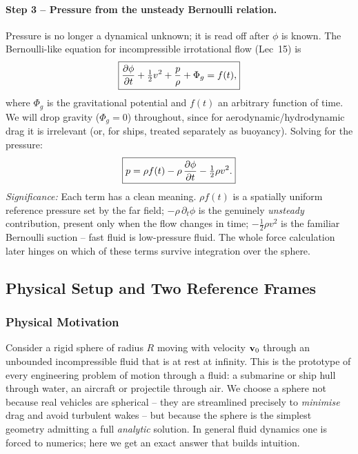 \documentclass[../main.tex]{subfiles}
\begin{document}
\paragraph{Step 3 -- Pressure from the unsteady Bernoulli relation.}
Pressure is no longer a dynamical unknown; it is read off after $\phi$ is known. The Bernoulli-like equation for incompressible irrotational flow (Lec~15) is
\begin{equation}
  \boxed{\pdv{\phi}{t} + \tfrac{1}{2}v^2 + \frac{p}{\rho} + \Phi_g = f(t),}
  \label{eq:lec16_bernoulli}
\end{equation}
where $\Phi_g$ is the gravitational potential and $f(t)$ an arbitrary function of time. We will drop gravity ($\Phi_g=0$) throughout, since for aerodynamic/hydrodynamic drag it is irrelevant (or, for ships, treated separately as buoyancy). Solving for the pressure:
\begin{equation}
  \boxed{p = \rho f(t) - \rho\,\pdv{\phi}{t} - \tfrac{1}{2}\rho v^2.}
  \label{eq:lec16_pressure}
\end{equation}
\textit{Significance:} Each term has a clean meaning. $\rho f(t)$ is a spatially uniform reference pressure set by the far field; $-\rho\,\partial_t\phi$ is the genuinely \emph{unsteady} contribution, present only when the flow changes in time; $-\tfrac{1}{2}\rho v^2$ is the familiar Bernoulli suction -- fast fluid is low-pressure fluid. The whole force calculation later hinges on which of these terms survive integration over the sphere.


\subsection{Physical Setup and Two Reference Frames}\label{sec:lec16:setup}

\subsubsection*{Physical Motivation}
Consider a rigid sphere of radius $R$ moving with velocity $\mathbf{v}_0$ through an unbounded incompressible fluid that is at rest at infinity. This is the prototype of every engineering problem of motion through a fluid: a submarine or ship hull through water, an aircraft or projectile through air. We choose a sphere not because real vehicles are spherical -- they are streamlined precisely to \emph{minimise} drag and avoid turbulent wakes -- but because the sphere is the simplest geometry admitting a full \emph{analytic} solution. In general fluid dynamics one is forced to numerics; here we get an exact answer that builds intuition.
\end{document}
